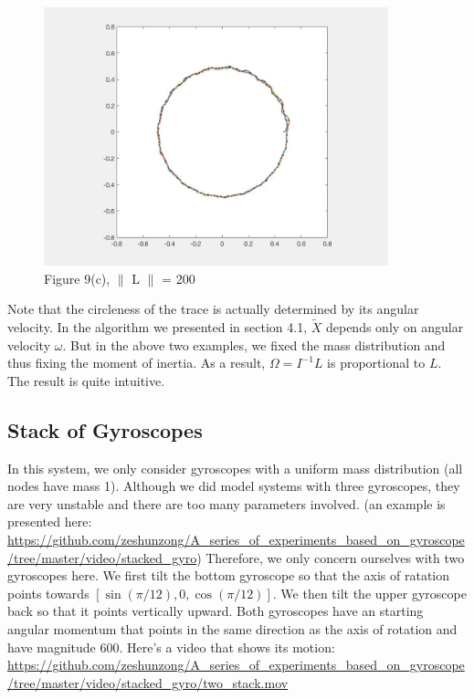\documentclass[12pt]{article}
\renewcommand{\(}{\left (}
\renewcommand{\)}{\right )}
\begin{document}
\begin{figure}[ht]
\begin{minipage}{0.33\textwidth}
		\centering
		\includegraphics[width=0.89\textwidth]{uneven_trisection_L200.jpg}
		\caption*{\small Figure 9(c), $\parallel$ L $\parallel$ = 200}
	\end{minipage}
\end{figure}

Note that the circleness of the trace is actually determined by its angular velocity. In the algorithm we presented in section 4.1, $\widetilde{X}$ depends only on angular velocity $\omega$. But in the above two examples, we fixed the mass distribution and thus fixing the moment of inertia. As a result, $\Omega = I^{-1}L$ is proportional to $L$. The result is quite intuitive.

\subsection{Stack of Gyroscopes}
\hspace{5mm} In this system, we only consider gyroscopes with a uniform mass distribution (all nodes have mass 1). Although we did model systems with three gyroscopes, they are very unstable and there are too many parameters involved. (an example is presented here: \url{https://github.com/zeshunzong/A_series_of_experiments_based_on_gyroscope/tree/master/video/stacked_gyro}) Therefore, we only concern ourselves with two gyroscopes here. We first tilt the bottom gyroscope so that the axis of ratation points towards $[\sin(\pi/12), 0, \cos(\pi/12)]$. We then tilt  the upper gyroscope back so that it points vertically upward. Both gyroscopes have an starting angular momentum that points in the same direction as the axis of rotation and have magnitude 600. Here's a video that shows its motion: \url{https://github.com/zeshunzong/A_series_of_experiments_based_on_gyroscope/tree/master/video/stacked_gyro/two_stack.mov}
\end{document}
